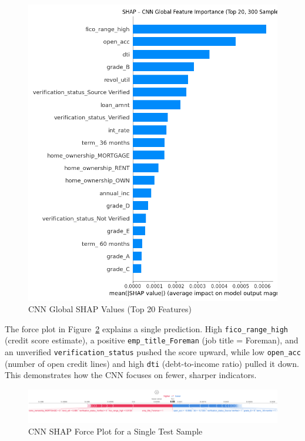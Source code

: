 \begin{figure}[H]
    \centering
    \includegraphics[width=0.85\linewidth]{figures/shap_cnn_bar.png}
    \caption{CNN Global SHAP Values (Top 20 Features)}
    \label{fig:cnn_shap_global}
\end{figure}

The force plot in Figure~\ref{fig:cnn_shap_local} explains a single prediction. High \texttt{fico\_range\_high} (credit score estimate), a positive \texttt{emp\_title\_Foreman} (job title = Foreman), and an unverified \texttt{verification\_status} pushed the score upward, while low \texttt{open\_acc} (number of open credit lines) and high \texttt{dti} (debt-to-income ratio) pulled it down. This demonstrates how the CNN focuses on fewer, sharper indicators.

\begin{figure}[H]
    \centering
    \includegraphics[width=0.95\linewidth]{figures/shap_cnn_force.png}
    \caption{CNN SHAP Force Plot for a Single Test Sample}
    \label{fig:cnn_shap_local}
\end{figure}

